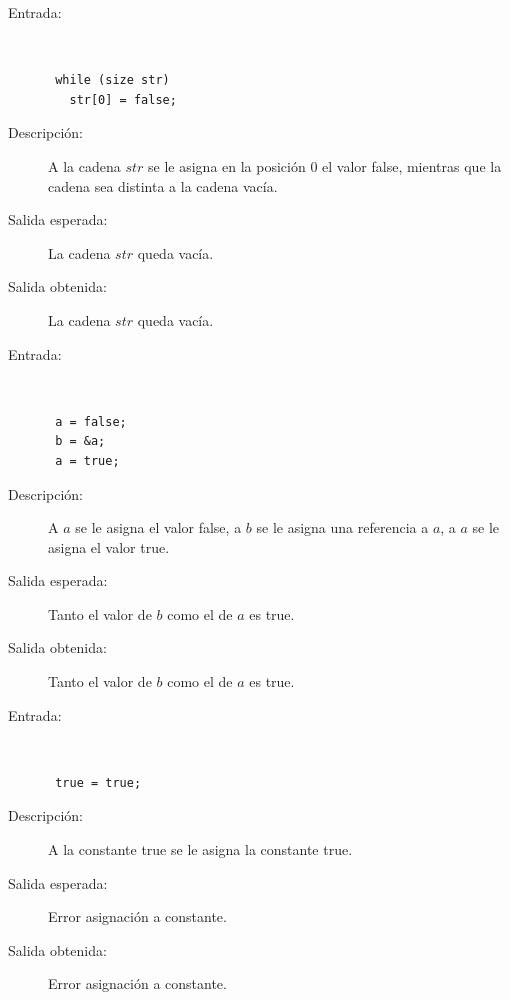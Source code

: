 \begin{framed}
	\begin{description}
		\item [Entrada:] \hfill \\
\begin{lstlisting}
 while (size str) 
   str[0] = false;
\end{lstlisting}
		\item [Descripción:] A la cadena $str$ se le asigna en la posición 0 el valor false, mientras que la cadena sea distinta a la cadena vacía.
		\item [Salida esperada:] La cadena $str$ queda vacía.
		\item [Salida obtenida:] La cadena $str$ queda vacía.
	\end{description}
\end{framed}

\begin{framed}
	\begin{description}
		\item [Entrada:] \hfill \\
\begin{lstlisting}
 a = false; 
 b = &a; 
 a = true; 
\end{lstlisting}
		\item [Descripción:] A $a$ se le asigna el valor false, a $b$ se le asigna una referencia a $a$, a $a$ se le asigna el valor true.
		\item [Salida esperada:] Tanto el valor de $b$ como el de $a$ es true.
		\item [Salida obtenida:] Tanto el valor de $b$ como el de $a$ es true.
	\end{description}
\end{framed}

\begin{framed}
	\begin{description}
		\item [Entrada:] \hfill \\
\begin{lstlisting}
 true = true;
\end{lstlisting}
		\item [Descripción:] A la constante true se le asigna la constante true.
		\item [Salida esperada:] Error asignación a constante.
		\item [Salida obtenida:] Error asignación a constante.
	\end{description}
\end{framed}

